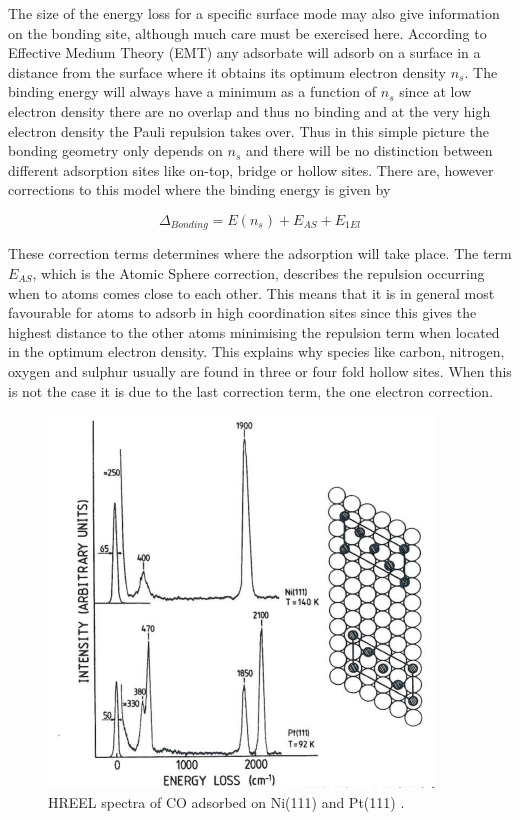 The size of the energy loss for a specific surface mode may also give information on the bonding site, although much care must be exercised here. According to Effective Medium Theory (EMT) any adsorbate will adsorb on a surface in a distance from the surface where it obtains its optimum electron density $n_s$. The binding energy will always have a minimum as a function of $n_s$ since at low electron density there are no overlap and thus no binding and at the very high electron density the Pauli repulsion takes over. Thus in this simple picture the bonding geometry only depends on $n_s$ and there will be no distinction between different adsorption sites like on-top, bridge or hollow sites. There are, however corrections to this model where the binding energy is  given by  

\begin{equation}
\Delta_{Bonding}=E(n_s)+E_{AS}+E_{1El}
\end{equation}

These correction terms determines where the adsorption will take place. The term $E_{AS}$, which is the Atomic Sphere correction, describes the repulsion occurring when to atoms comes close to each other. This means that it is in general most favourable for atoms to adsorb in high coordination sites since this gives the highest distance to the other atoms  minimising the repulsion term when located in the optimum electron density. This explains why species like carbon, nitrogen, oxygen and sulphur usually are found in three or four fold hollow sites. When this is not the case it is due to the last  correction term, the one electron correction.

\begin{figure}[h!]
	\begin{center}
	\includegraphics[scale=4]{figures/08_07.png}
	\caption{HREEL spectra of CO adsorbed on Ni(111) and Pt(111) \cite{Ibach}.}
	\label{fig:conipthreels}
	\end{center}
\end{figure}

